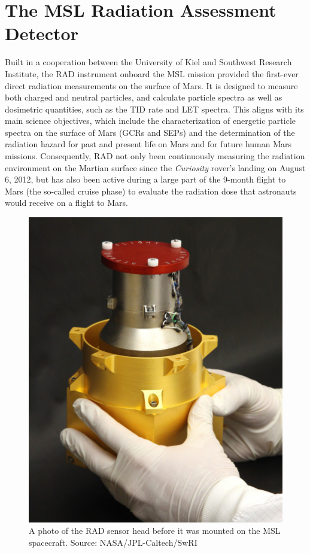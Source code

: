 \section{The MSL Radiation Assessment Detector}
\label{sec:mslrad}

Built in a cooperation between the University of Kiel and Southwest Research Institute, the \acl{RAD} \citep[\acs{RAD},][]{Hassler-2012-MSLRAD} instrument onboard the \acl{MSL} \citep[\acs{MSL},][]{Grotzinger-2012} mission provided the first-ever direct radiation measurements on the surface of Mars. It is designed to measure both charged and neutral particles, and calculate particle spectra as well as dosimetric quantities, such as the \ac{TID} rate and \ac{LET} spectra. This aligns with its main science objectives, which include the characterization of energetic particle spectra on the surface of Mars (\acp{GCR} and \acp{SEP}) and the determination of the radiation hazard for past and present life on Mars and for future human Mars missions. Consequently, \ac{RAD} not only been continuously measuring the radiation environment on the Martian surface since the \textit{Curiosity} rover's landing on August 6, 2012, but has also been active during a large part of the 9-month flight to Mars (the so-called cruise phase) to evaluate the radiation dose that astronauts would receive on a flight to Mars.

\begin{figure}
	\centering
	\includegraphics[width=0.4\linewidth]{images/rad}
	\caption[Photo of the \acs{RAD} sensor head]{A photo of the \ac{RAD} sensor head before it was mounted on the \ac{MSL} spacecraft. Source: NASA/JPL-Caltech/SwRI}
	\label{fig:rad-photo}
\end{figure}

